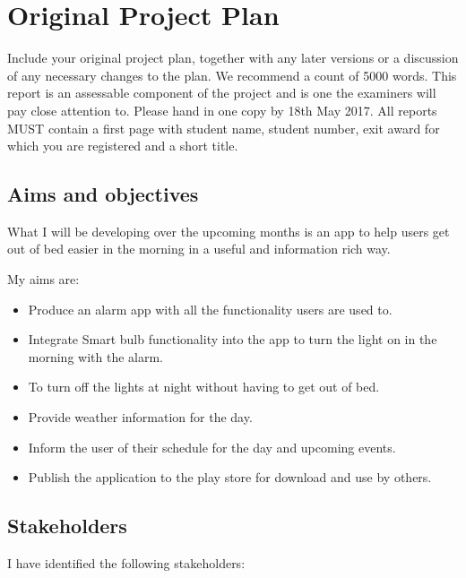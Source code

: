 \section{Original Project Plan}\label{original-project-plan}

Include your original project plan, together with any later versions or
a discussion of any necessary changes to the plan. We recommend a count
of 5000 words. This report is an assessable component of the project and
is one the examiners will pay close attention to. Please hand in one
copy by 18th May 2017. All reports MUST contain a first page with
student name, student number, exit award for which you are registered
and a short title.

\subsection{Aims and objectives}\label{aims-and-objectives}

What I will be developing over the upcoming months is an app to help
users get out of bed easier in the morning in a useful and information
rich way.

My aims are:

\begin{itemize}
\tightlist
\item
  Produce an alarm app with all the functionality users are used to.
\item
  Integrate Smart bulb functionality into the app to turn the light on
  in the morning with the alarm.
\item
  To turn off the lights at night without having to get out of bed.
\item
  Provide weather information for the day.
\item
  Inform the user of their schedule for the day and upcoming events.
\item
  Publish the application to the play store for download and use by
  others.
\end{itemize}

\subsection{Stakeholders}\label{stakeholders}

I have identified the following stakeholders:

